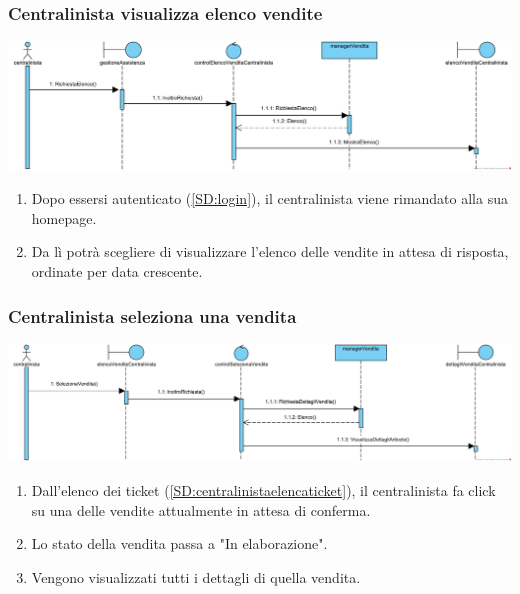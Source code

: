 \documentclass[12pt]{article}
\begin{document}
\subsubsection{Centralinista visualizza elenco vendite}
\label{SD:elencovenditecentralinista}

\begin{center}
\includegraphics[width=\textwidth]{SequenceDiagram/CentralinistaVenditeElenco}
\end{center}

\begin{enumerate}
\item Dopo essersi autenticato (\ref{SD:login}), il centralinista viene rimandato alla sua homepage. 
\item Da lì potrà scegliere di visualizzare l'elenco delle vendite in attesa di risposta, ordinate per data crescente.
\end{enumerate}

\subsubsection{Centralinista seleziona una vendita}
\label{SD:selezionevenditacentralinista}

\begin{center}
\includegraphics[width=\textwidth]{SequenceDiagram/CentralinistaVenditaSeleziona}
\end{center}

\begin{enumerate}
\item Dall'elenco dei ticket (\ref{SD:centralinistaelencaticket}), il centralinista fa click su una delle vendite attualmente in attesa di conferma.
\item Lo stato della vendita passa a "In elaborazione".
\item Vengono visualizzati tutti i dettagli di quella vendita.
\end{enumerate}
\end{document}
